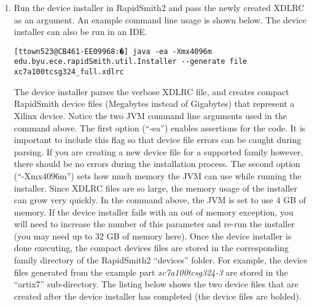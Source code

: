 \begin {enumerate}
\begin{lstlisting}[numbers=none]
bond@CB461-EE10342:~$ vivado -mode tcl

****** Vivado v2016.2 (64-bit)
  **** SW Build 1577090 on Thu Jun  2 16:32:35 MDT 2016
  **** IP Build 1577682 on Fri Jun  3 12:00:54 MDT 2016
    ** Copyright 1986-2016 Xilinx, Inc. All Rights Reserved.

Vivado% tincr::create_xml_device_info /home/bond/RapidSmith2/devices/artix7/ xc7a100tcsg324-3
\end{lstlisting}

\noindent You will need to save the deviceInfo file in the corresponding device
folder in RapidSmith2. In the above example, it was created there so no further
steps are necessary.

\item Run the device installer in RapidSmith2 and pass the newly created XDLRC
as an argument. An example command line usage is shown below. The device
installer can also be run in an IDE.

\begin{lstlisting}[numbers=none]
[ttown523@CB461-EE09968:�] java -ea -Xmx4096m edu.byu.ece.rapidSmith.util.Installer --generate file xc7a100tcsg324_full.xdlrc
\end{lstlisting} 

\noindent The device installer parses the verbose XDLRC file, and creates
compact RapidSmith device files (Megabytes instead of Gigabytes) that represent
a Xilinx device. Notice the two JVM command line arguments used in the command
above. The first option (``-ea'') enables assertions for the code. It is important
to include this flag so that device file errors can be caught during parsing.
If you are creating a new device file for a supported family however, there
should be no errors during the installation process. The second option
(``-Xmx4096m'') sets how much memory the JVM can use while running the
installer. Since XDLRC files are so large, the memory usage of the installer can
grow very quickly. In the command above, the JVM is set to use 4 GB of memory.
If the device installer fails with an out of memory exception, you will
need to increase the number of this parameter and re-run the installer (you may
need up to 32 GB of memory here). Once the device installer is done executing,
the compact devices files are stored in the corresponding family directory of
the RapidSmith2 ``devices'' folder. For example, the device files generated
from the example part \textit{xc7a100tcsg324-3} are stored in the ``artix7''
sub-directory. The listing below shows the two device files that are created
after the device installer has completed (the device files are bolded).


\end{enumerate}
